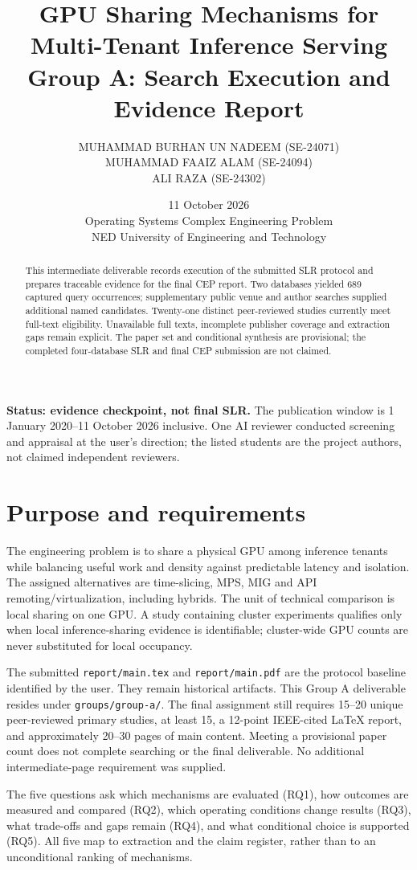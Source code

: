 \documentclass[12pt,a 4paper]{article}
\title{GPU Sharing Mechanisms for Multi-Tenant Inference Serving\\\large Group A: Search Execution and Evidence Report}
\author{MUHAMMAD BURHAN UN NADEEM (SE-24071)\\MUHAMMAD FAAIZ ALAM (SE-24094)\\ALI RAZA (SE-24302)}
\date{11 October 2026\\Operating Systems Complex Engineering Problem\\NED University of Engineering and Technology}
\begin{document}
\maketitle
\begin{abstract}
This intermediate deliverable records execution of the submitted SLR protocol and prepares traceable evidence for the final CEP report. Two databases yielded 689 captured query occurrences; supplementary public venue and author searches supplied additional named candidates. Twenty-one distinct peer-reviewed studies currently meet full-text eligibility. Unavailable full texts, incomplete publisher coverage and extraction gaps remain explicit. The paper set and conditional synthesis are provisional; the completed four-database SLR and final CEP submission are not claimed.
\end{abstract}
\textbf{Status: evidence checkpoint, not final SLR.} The publication window is 1 January 2020--11 October 2026 inclusive. One AI reviewer conducted screening and appraisal at the user's direction; the listed students are the project authors, not claimed independent reviewers.
\newpage\tableofcontents\newpage
\section{Purpose and requirements}
The engineering problem is to share a physical GPU among inference tenants while balancing useful work and density against predictable latency and isolation. The assigned alternatives are time-slicing, MPS, MIG and API remoting/virtualization, including hybrids. The unit of technical comparison is local sharing on one GPU. A study containing cluster experiments qualifies only when local inference-sharing evidence is identifiable; cluster-wide GPU counts are never substituted for local occupancy.

The submitted \texttt{report/main.tex} and \texttt{report/main.pdf} are the protocol baseline identified by the user. They remain historical artifacts. This Group A deliverable resides under \texttt{groups/group-a/}. The final assignment still requires 15--20 unique peer-reviewed primary studies, at least 15, a 12-point IEEE-cited LaTeX report, and approximately 20--30 pages of main content. Meeting a provisional paper count does not complete searching or the final deliverable. No additional intermediate-page requirement was supplied.

The five questions ask which mechanisms are evaluated (RQ1), how outcomes are measured and compared (RQ2), which operating conditions change results (RQ3), what trade-offs and gaps remain (RQ4), and what conditional choice is supported (RQ5). All five map to extraction and the claim register, rather than to an unconditional ranking of mechanisms.
\end{document}
